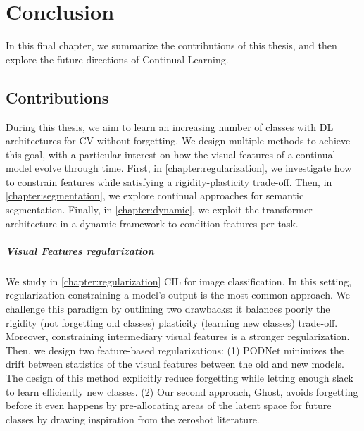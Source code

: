 \chapter{Conclusion}
\label{chapter:conclusion}

{}


In this final chapter, we summarize the contributions of this thesis, and then
explore the future directions of Continual Learning.

\section{Contributions}

During this thesis, we aim to learn an increasing number of classes with \ac{DL} architectures for
\ac{CV} without forgetting. We design multiple methods to achieve this goal, with a particular
interest on how the visual features of a continual model evolve through time. First, in
\autoref{chapter:regularization}, we investigate how to constrain features while satisfying a
rigidity-plasticity trade-off. Then, in \autoref{chapter:segmentation}, we explore continual
approaches for semantic segmentation. Finally, in \autoref{chapter:dynamic}, we exploit the
transformer architecture in a dynamic framework to condition features per task.

\paragraph{Visual Features regularization} We study in \autoref{chapter:regularization} \ac{CIL} for
image classification. In this setting, regularization constraining a model's output is the most
common approach. We challenge this paradigm by outlining two drawbacks: it balances poorly the
rigidity (not forgetting old classes) \vs plasticity (learning new classes) trade-off. Moreover,
constraining intermediary visual features is a stronger regularization. Then, we design two
feature-based regularizations: (1) PODNet minimizes the drift between statistics of the visual
features between the old and new models. The design of this method explicitly reduce forgetting
while letting enough slack to learn efficiently new classes. (2) Our second approach, Ghost, avoids
forgetting before it even happens by pre-allocating areas of the latent space for future classes by
drawing inspiration from the zeroshot literature.

